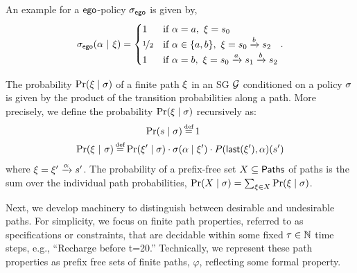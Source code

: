{{{%


\begin{example}
  An example for a $\mathsf{ego}$-policy ${\sigma_{\mathsf{ego}}}$ is given
  by,
  \begin{equation}
    {\sigma_{\mathsf{ego}}}(\alpha~|~\xi) =
    \begin{cases}
      1 & \text{if } \alpha = a,~\xi = s_0\\
      \nicefrac{1}{2} & \text{if } \alpha \in \{a, b\},~\xi = s_0\xrightarrow{b}s_2\\
      1 & \text{if } \alpha = b,~\xi = s_0\xrightarrow{a}s_1\xrightarrow{b}s_2\\
    \end{cases}.
  \end{equation}
\end{example}


The probability $\Pr(\xi \mid \sigma)$ of a finite path $\xi$ in an SG $\mathcal{G}$ conditioned on a policy $\sigma$ is given by the product of the transition probabilities along a path. 
More precisely, we define the probability $\Pr(\xi \mid \sigma)$ recursively as:
\begin{equation}
  \begin{split}
    \Pr(s \mid \sched) &\eqdef 1\\
    \Pr(\path~|~\sigma) \eqdef \Pr(\path'\mid\sched)\cdot \sched(&\act\mid\path') \cdot P(\last{\path'},\act)(s')\\
  \end{split}
\end{equation}
where $\xi =  \xi' \xrightarrow{\alpha} s'$.
The probability of a prefix-free set $X \subseteq \mathsf{Paths}^{}_{}$  of paths is the sum over the individual path probabilities, $\Pr(X \mid \sigma) = \sum_{\xi \in X} \Pr(\xi \mid \sigma )$.

Next, we develop machinery to distinguish between desirable and
undesirable paths. For simplicity, we focus on finite path properties,
referred to as specifications or constraints, that are decidable
within some fixed $\tau \in \mathbb{N}$ time steps, e.g., ``Recharge before
t=20.'' Technically, we represent these path properties as prefix free
sets of finite paths, $\varphi$, reflecting some formal
property\footnotemark.

}}}
